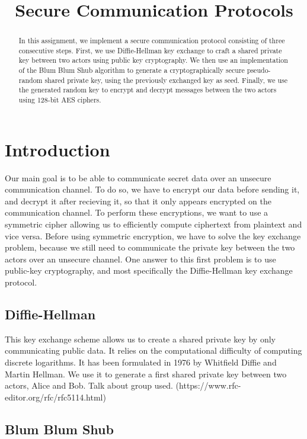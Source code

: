 \documentclass{article}
\title{\textbf{Secure Communication Protocols}}
\author{}
\date{}
\begin{document}
\maketitle \thispagestyle{fancy}

\begin{abstract}
    In this assignment, we implement a secure communication protocol consisting of three consecutive steps. First, we use Diffie-Hellman\cite{stallings_2017} key exchange to craft a shared private key between two actors using public key cryptography. We then use an implementation of the Blum Blum Shub algorithm to generate a cryptographically secure pseudo-random shared private key, using the previously exchanged key as seed. Finally, we use the generated random key to encrypt and decrypt messages between the two actors using 128-bit AES ciphers.
\end{abstract}

\section{Introduction}

Our main goal is to be able to communicate secret data over an unsecure communication channel. To do so, we have to encrypt our data before sending it, and decrypt it after recieving it, so that it only appears encrypted on the communication channel.
To perform these encryptions, we want to use a symmetric cipher allowing us to efficiently compute ciphertext from plaintext and vice versa. Before using symmetric encryption, we have to solve the key exchange problem, because we still need to communicate the private key between the two actors over an unsecure channel.
One answer to this first problem is to use public-key cryptography, and most specifically the Diffie-Hellman key exchange protocol. 

\subsection{Diffie-Hellman}

This key exchange scheme allows us to create a shared private key by only communicating public data. It relies on the computational difficulty of computing discrete logarithms. It has been formulated in 1976 by Whitfield Diffie and Martin Hellman. We use it to generate a first shared private key between two actors, Alice and Bob.
Talk about group used. (https://www.rfc-editor.org/rfc/rfc5114.html)

\subsection{Blum Blum Shub}
\end{document}
